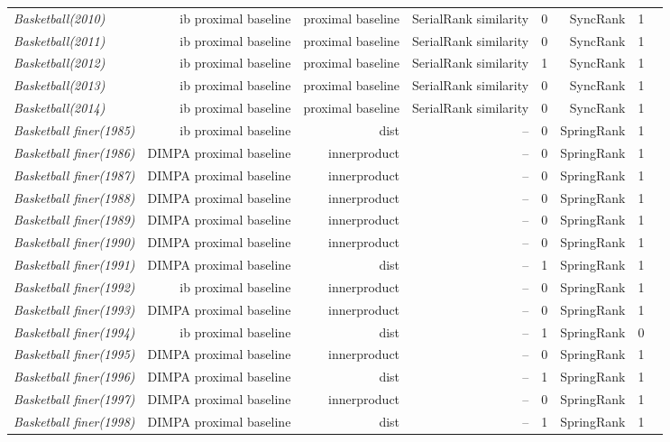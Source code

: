 \documentclass[nohyperref]{article}
\theoremstyle{plain}
\theoremstyle{definition}
\theoremstyle{remark}
\begin{document}
\begin{table*}[!ht]
{\begin{tabular}{lrrrrrrr}
			{\it Basketball(2010)} & ib proximal baseline & proximal baseline & SerialRank similarity & 0 & SyncRank & 1 \\
			{\it Basketball(2011)} & ib proximal baseline & proximal baseline & SerialRank similarity & 0 & SyncRank & 1 \\
			{\it Basketball(2012)} & ib proximal baseline & proximal baseline & SerialRank similarity & 1 & SyncRank & 1 \\
			{\it Basketball(2013)} & ib proximal baseline & proximal baseline & SerialRank similarity & 0 & SyncRank & 1 \\
			{\it Basketball(2014)} & ib proximal baseline & proximal baseline & SerialRank similarity & 0 & SyncRank & 1 \\
			{\it Basketball finer(1985)} & ib proximal baseline & dist & -- & 0 & SpringRank & 1 \\
			{\it Basketball finer(1986)} & DIMPA proximal baseline & innerproduct & -- & 0 & SpringRank & 1 \\
			{\it Basketball finer(1987)} & DIMPA proximal baseline & innerproduct & -- & 0 & SpringRank & 1 \\
			{\it Basketball finer(1988)} & DIMPA proximal baseline & innerproduct & -- & 0 & SpringRank & 1 \\
			{\it Basketball finer(1989)} & DIMPA proximal baseline & innerproduct & -- & 0 & SpringRank & 1 \\
			{\it Basketball finer(1990)} & DIMPA proximal baseline & innerproduct & -- & 0 & SpringRank & 1 \\
			{\it Basketball finer(1991)} & DIMPA proximal baseline & dist & -- & 1 & SpringRank & 1 \\
			{\it Basketball finer(1992)} & ib proximal baseline & innerproduct & -- & 0 & SpringRank & 1 \\
			{\it Basketball finer(1993)} & DIMPA proximal baseline & innerproduct & -- & 0 & SpringRank & 1 \\
			{\it Basketball finer(1994)} & ib proximal baseline & dist & -- & 1 & SpringRank & 0 \\
			{\it Basketball finer(1995)} & DIMPA proximal baseline & innerproduct & -- & 0 & SpringRank & 1 \\
			{\it Basketball finer(1996)} & DIMPA proximal baseline & dist & -- & 1 & SpringRank & 1 \\
			{\it Basketball finer(1997)} & DIMPA proximal baseline & innerproduct & -- & 0 & SpringRank & 1 \\
			{\it Basketball finer(1998)} & DIMPA proximal baseline & dist & -- & 1 & SpringRank & 1 \\

\end{tabular}}
\end{table*}
\end{document}
